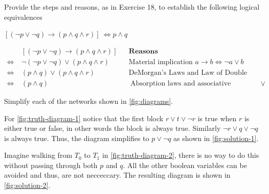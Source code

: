 \documentclass[a4paper, english, 12pt]{article} %
\begin{document}
\titlebox


\begin{problem}[19]
  Provide the steps and reasons, as in Exercise 18, to establish the following
  logical equivalences
\end{problem}

\begin{subproblem}[3]
  $[(\neg p \vee \neg q) \to (p \wedge q \wedge r)] \ \Leftrightarrow p \wedge q$
\end{subproblem}

\begin{answer}  
  \begin{align*}
                    \ & [(\neg p \vee \neg q) \to (p \wedge q \wedge r)]
                      && \textbf{Reasons}\\
    \Leftrightarrow \ & \neg (\neg p \vee \neg q) \vee  (p \wedge q \wedge r)
                      && \text{Material implication $a\to b \Leftrightarrow \neg a \vee b$}\\
    \Leftrightarrow \ &  (p \wedge q) \vee  (p \wedge q \wedge r)
                      && \text{DeMorgan's Laws and Law of Double Negation}\\
    \Leftrightarrow \ &  (p \wedge q)
                      && \text{Absorption laws and associative properties of $\vee$}.
  \end{align*}
\end{answer}

\begin{problem}
  Simplify each of the networks shown in \cref{fig:diagrams}.
\end{problem}

\begin{answer}
  For \cref{fig:truth-diagram-1} notice that the first block $r \vee t \vee \neg
  r$ is true when $r$ is either true or false, in other words the block is
  always true. Similarly $\neg r \vee q \vee \neg q$ is always true. Thus, the
  diagram simplifies to $p \vee \neg q$ as shown in \cref{fig:solution-1}.

  Imagine walking from $T_0$ to $T_1$ in \cref{fig:truth-diagram-2}, there is no
  way to do this without passing through both $p$ and $q$. All the other boolean
  variables can be avoided and thus, are not necceccary. The resulting diagram
  is shown in \cref{fig:solution-2}.
\end{answer}
\end{document}
